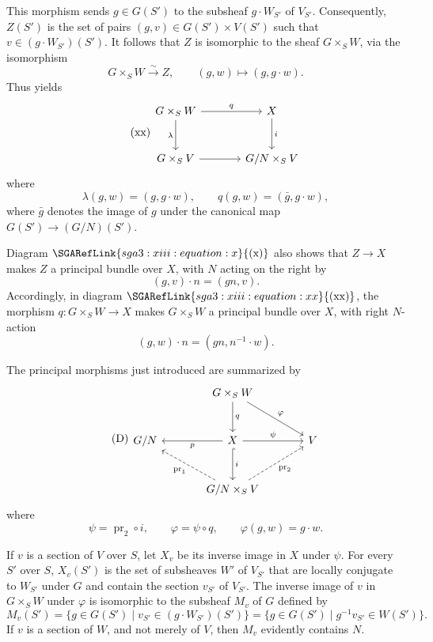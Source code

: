 This morphism sends \(g\in G(S')\) to the subsheaf
\(g\cdot W_{S'}\) of \(V_{S'}\). Consequently, \(Z(S')\) is the set
of pairs \((g,v)\in G(S')\times V(S')\) such that
\(v\in (g\cdot W_{S'})(S')\). It follows that \(Z\) is isomorphic to
the sheaf \(G\times_S W\), via the isomorphism
\[
  G\times_S W \xrightarrow{\sim} Z,\qquad
  (g,w)\longmapsto(g,g\cdot w).
\]
Thus  yields 
\[
\tag{xx}\label{sga3:xiii:equation:xx}
\begin{tikzcd}[column sep=large,row sep=large]
G\times_S W \arrow[r,"q"] \arrow[d,"\lambda"'] &
  X \arrow[d,"i"] \\
G\times_S V \arrow[r] & G/N\times_S V
\end{tikzcd}
\]
where
\[
  \lambda(g,w)=(g,g\cdot w),\qquad
  q(g,w)=(\bar g,g\cdot w),
\]
where \(\bar g\) denotes the image of \(g\) under the canonical map
\(G(S')\to(G/N)(S')\).

Diagram \(\SGARefLink{sga3:xiii:equation:x}{\mathrm{(x)}}\) also shows that \(Z\to X\) makes \(Z\) a
principal bundle over \(X\), with \(N\) acting on the right by
\[
  (g,v)\cdot n=(gn,v).
\]
Accordingly, in diagram \(\SGARefLink{sga3:xiii:equation:xx}{\mathrm{(xx)}}\), the morphism
\(q:G\times_S W\to X\) makes \(G\times_S W\) a principal bundle over
\(X\), with right \(N\)-action
\[
  (g,w)\cdot n=(gn,n^{-1}\cdot w).
\]

The principal morphisms just introduced are summarized by
\[
\tag{D}\label{sga3:xiii:equation:d}
\begin{tikzcd}[column sep=large,row sep=large]
& G\times_S W \arrow[d,"q"] \arrow[dr,"\varphi"] & \\
G/N &
X \arrow[l,"p"] \arrow[r,"\psi"] \arrow[d,hook,"i"] &
V \\
& G/N\times_S V
  \arrow[ul,dashed,"\operatorname{pr}_1"]
  \arrow[ur,dashed,"\operatorname{pr}_2"'] &
\end{tikzcd}
\]
where
\[
  \psi=\operatorname{pr}_2\circ i,\qquad
  \varphi=\psi\circ q,\qquad
  \varphi(g,w)=g\cdot w.
\]

If \(v\) is a section of \(V\) over \(S\), let \(X_v\) be its inverse
image in \(X\) under \(\psi\). For every \(S'\) over \(S\),
\(X_v(S')\) is the set of subsheaves \(W'\) of \(V_{S'}\) that are
locally conjugate to \(W_{S'}\) under \(G\) and contain the section
\(v_{S'}\) of \(V_{S'}\). The inverse image of \(v\) in
\(G\times_S W\) under \(\varphi\) is isomorphic to the subsheaf
\(M_v\) of \(G\) defined by
\[
  M_v(S')=
  \bigl\{g\in G(S')\mid v_{S'}\in(g\cdot W_{S'})(S')\bigr\}
  =
  \bigl\{g\in G(S')\mid g^{-1}v_{S'}\in W(S')\bigr\}.
\]
If \(v\) is a section of \(W\), and not merely of \(V\), then
\(M_v\) evidently contains \(N\).

